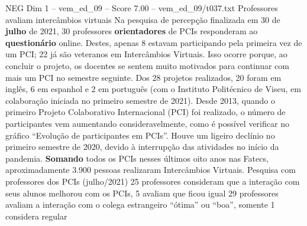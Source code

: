 \begin{textsample}{NEG Dim 1 – vem\_ed\_09 – Score 7.00 – vem\_ed\_09/t037.txt}  \label{ex:f1_neg_103}
Professores avaliam intercâmbios virtuais Na pesquisa de percepção finalizada em 30 de \textbf{julho} de 2021, 30 professores \textbf{orientadores} de PCIs responderam ao \textbf{questionário} online.
Destes, apenas 8 estavam participando pela primeira vez de um PCI; 22 já são veteranos em Intercâmbios Virtuais.
Isso ocorre porque, ao concluir o projeto, os docentes se sentem muito motivados para continuar com mais um PCI no semestre seguinte.
Dos 28 projetos realizados, 20 foram em inglês, 6 em espanhol e 2 em português (com o Instituto Politécnico de Viseu, em colaboração iniciada no primeiro semestre de 2021).
Desde 2013, quando o primeiro Projeto Colaborativo Internacional (PCI) foi realizado, o número de participantes vem aumentando consideravelmente, como é possível verificar no gráfico “Evolução de participantes em PCIs”.
Houve um ligeiro declínio no primeiro semestre de 2020, devido à interrupção das atividades no início da pandemia. \textbf{Somando} todos os PCIs nesses últimos oito anos nas Fatecs, aproximadamente 3.900 pessoas realizaram Intercâmbios Virtuais.
Pesquisa com professores dos PCIs (julho/2021) 25 professores consideram que a interação com seus alunos melhorou com os PCIs, 5 avaliam que ficou igual 29 professores avaliam a interação com o colega estrangeiro “ótima” ou “boa”, somente 1 considera regular

\end{textsample}
